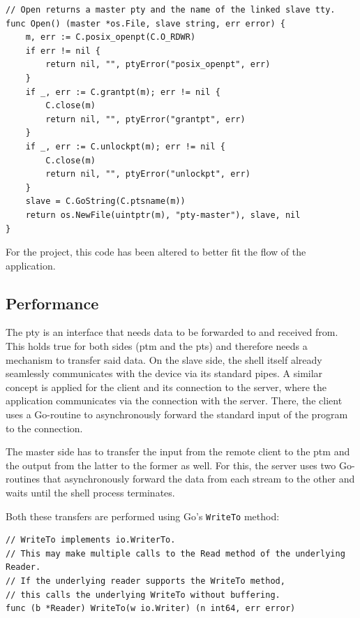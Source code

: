 \documentclass[10pt,a4paper,titlepage,twoside,english,final]{zhawreprt}
\begin{document}
\setlistingGo
\begin{lstlisting}[caption={\gls{Go}'s \gls{pty} wrapper},label=lst:GoPty]
// Open returns a master pty and the name of the linked slave tty.
func Open() (master *os.File, slave string, err error) {
	m, err := C.posix_openpt(C.O_RDWR)
	if err != nil {
		return nil, "", ptyError("posix_openpt", err)
	}
	if _, err := C.grantpt(m); err != nil {
		C.close(m)
		return nil, "", ptyError("grantpt", err)
	}
	if _, err := C.unlockpt(m); err != nil {
		C.close(m)
		return nil, "", ptyError("unlockpt", err)
	}
	slave = C.GoString(C.ptsname(m))
	return os.NewFile(uintptr(m), "pty-master"), slave, nil
}
\end{lstlisting}
For the project, this code has been altered to better fit the flow of the application.


\subsection{Performance}\label{ssec:Performance}
The \gls{pty} is an interface that needs data to be forwarded to and received from.
This holds true for both sides (\gls{ptm} and the \gls{pts}) and therefore needs a mechanism to transfer said data.
On the slave side, the \gls{shell} itself already seamlessly communicates with the device via its standard pipes.
A similar concept is applied for the client and its connection to the server, where the application communicates via the connection with the server.
There, the client uses a \gls{Go}-routine to asynchronously forward the standard input of the program to the connection.

The master side has to transfer the input from the remote client to the \gls{ptm} and the output from the latter to the former as well.
For this, the server uses two \gls{Go}-routines that asynchronously forward the data from each stream to the other and waits until the shell process terminates.

Both these transfers are performed using \gls{Go}'s \texttt{WriteTo} method:
\setlistingGo
\begin{lstlisting}[caption={\texttt{WriteTo} method of \gls{Go}},label=lst:GoWriteTo]
// WriteTo implements io.WriterTo.
// This may make multiple calls to the Read method of the underlying Reader.
// If the underlying reader supports the WriteTo method,
// this calls the underlying WriteTo without buffering.
func (b *Reader) WriteTo(w io.Writer) (n int64, err error)
\end{lstlisting}
\end{document}

